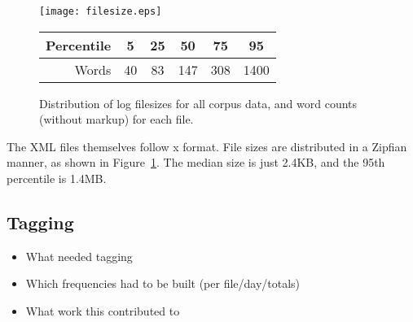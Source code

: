 \begin{figure}[h]
    \centering
    \texttt{[image: filesize.eps]}


    \begin{tabular}{ | r | c | c | c | c | c | }
        \hline
        Percentile & 5 & 25 & 50 & 75 & 95 \\ \hline
        Words & 40 & 83 & 147 & 308 & 1400 \\ \hline
    \end{tabular}

    \caption{Distribution of log filesizes for all corpus data, and word counts (without markup) for each file.}
    \label{fig:filesizes}
\end{figure}



The XML files themselves follow x format. File sizes are distributed in a Zipfian manner, as shown in Figure~\ref{fig:filesizes}. The median size is just 2.4KB, and the 95th percentile is 1.4MB.




\subsection{Tagging}
\begin{itemize}
    \item What needed tagging
    \item Which frequencies had to be built (per file/day/totals)
    \item What work this contributed to
\end{itemize}
